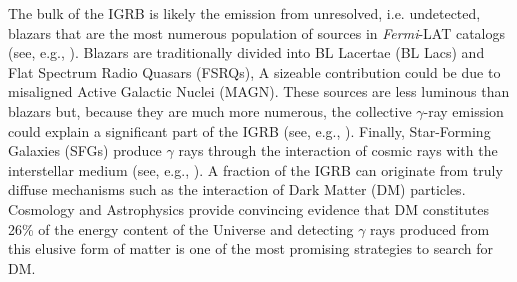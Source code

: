 \documentclass[12 pt]{article}
\newcommand{\FIXME}[1]{{\color{red}{\em Comment: }{#1}}}
\begin{document}
The bulk of the IGRB is likely the emission from unresolved, i.e. undetected, blazars that are the most numerous population of sources in {\it Fermi}-LAT catalogs (see, e.g., \cite{Ajello:2015mfa}).
Blazars are traditionally divided into BL Lacertae (BL Lacs) and Flat Spectrum Radio Quasars (FSRQs),
A sizeable contribution could be due to misaligned Active Galactic Nuclei (MAGN). 
These sources are less luminous than blazars but, because they are much more numerous, the collective $\gamma$-ray emission could explain a significant part of the IGRB (see, e.g., \cite{DiMauro:2013xta}).
Finally, Star-Forming Galaxies (SFGs) produce $\gamma$ rays through the interaction of cosmic rays with the interstellar medium (see, e.g., \cite{2012ApJ...755..164A}).
A fraction of the IGRB can originate from truly diffuse mechanisms such as the interaction of Dark Matter (DM) particles. Cosmology and Astrophysics provide convincing evidence that DM constitutes 26\% of the energy content of the Universe and detecting $\gamma$ rays produced from this elusive form of matter is one of the most promising strategies to search for DM.  
\end{document}
